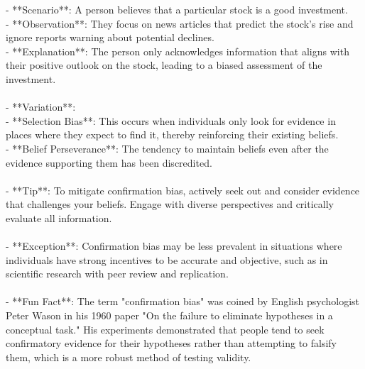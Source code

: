 \documentclass[a4paper,12pt,single,pdftex]{scrartcl}
\begin{document}
{    
        - **Scenario**: A person believes that a particular stock is a good investment.
    \\

    
        - **Observation**: They focus on news articles that predict the stock's rise and ignore reports warning about potential declines.
    \\

    
        - **Explanation**: The person only acknowledges information that aligns with their positive outlook on the stock, leading to a biased assessment of the investment.
    \\

    
      
    \\

    
      - **Variation**:
    \\

    
        - **Selection Bias**: This occurs when individuals only look for evidence in places where they expect to find it, thereby reinforcing their existing beliefs.
    \\

    
        - **Belief Perseverance**: The tendency to maintain beliefs even after the evidence supporting them has been discredited.
    \\

    
      
    \\

    
      - **Tip**: To mitigate confirmation bias, actively seek out and consider evidence that challenges your beliefs. Engage with diverse perspectives and critically evaluate all information.
    \\

    
      
    \\

    
      - **Exception**: Confirmation bias may be less prevalent in situations where individuals have strong incentives to be accurate and objective, such as in scientific research with peer review and replication.
    \\

    
      
    \\

    
      - **Fun Fact**: The term "confirmation bias" was coined by English psychologist Peter Wason in his 1960 paper "On the failure to eliminate hypotheses in a conceptual task." His experiments demonstrated that people tend to seek confirmatory evidence for their hypotheses rather than attempting to falsify them, which is a more robust method of testing validity.
    \\

  }
\end{document}
